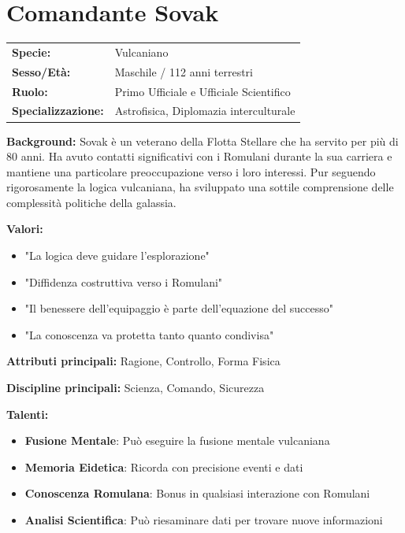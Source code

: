 \documentclass[11pt,a4paper]{article}
\begin{document}
\section{Comandante Sovak}

\begin{tcolorbox}[colback=fedlightblue!10, colframe=fedblue]
\begin{tabularx}{\textwidth}{lX}
\textbf{Specie:} & Vulcaniano \\
\textbf{Sesso/Età:} & Maschile / 112 anni terrestri \\
\textbf{Ruolo:} & Primo Ufficiale e Ufficiale Scientifico \\
\textbf{Specializzazione:} & Astrofisica, Diplomazia interculturale \\
\end{tabularx}

\textbf{Background:} Sovak è un veterano della Flotta Stellare che ha servito per più di 80 anni. Ha avuto contatti significativi con i Romulani durante la sua carriera e mantiene una particolare preoccupazione verso i loro interessi. Pur seguendo rigorosamente la logica vulcaniana, ha sviluppato una sottile comprensione delle complessità politiche della galassia.

\textbf{Valori:}
\begin{itemize}[leftmargin=*]
\item "La logica deve guidare l'esplorazione"
\item "Diffidenza costruttiva verso i Romulani"
\item "Il benessere dell'equipaggio è parte dell'equazione del successo"
\item "La conoscenza va protetta tanto quanto condivisa"
\end{itemize}

\textbf{Attributi principali:} Ragione, Controllo, Forma Fisica

\textbf{Discipline principali:} Scienza, Comando, Sicurezza

\textbf{Talenti:}
\begin{itemize}[leftmargin=*]
\item \textbf{Fusione Mentale}: Può eseguire la fusione mentale vulcaniana
\item \textbf{Memoria Eidetica}: Ricorda con precisione eventi e dati
\item \textbf{Conoscenza Romulana}: Bonus in qualsiasi interazione con Romulani
\item \textbf{Analisi Scientifica}: Può riesaminare dati per trovare nuove informazioni
\end{itemize}
\end{tcolorbox}
\end{document}
